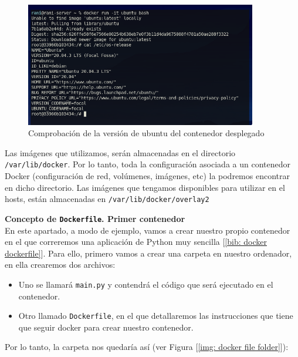 \documentclass[a4paper, oneside, 12pt]{book}
\begin{document}
	\begin{figure}[h]
		\begin{center}
			\includegraphics[width=0.9\textwidth]{img/docker_ubuntu_ver.png}
			\caption{Comprobación de la versión de ubuntu del contenedor desplegado}
			\label{img: docker ubuntu ver}
		\end{center}
	\end{figure}

	\noindent Las imágenes que utilizamos, serán almacenadas en el directorio \texttt{/var/lib/docker}. Por lo tanto, toda la configuración asociada a un contenedor Docker (configuración de red, volúmenes, imágenes, etc) la podremos encontrar en dicho directorio. Las imágenes que tengamos disponibles para utilizar en el hosts, están almacenadas en \texttt{/var/lib/docker/overlay2}

	\pagebreak

	\noindent \textbf{\large Concepto de \texttt{Dockerfile}. Primer contenedor}\\
	
	\noindent En este apartado, a modo de ejemplo, vamos a crear nuestro propio contenedor en el que correremos una aplicación de Python muy sencilla [\ref{bib: docker dockerfile}]. Para ello, primero vamos a crear una carpeta en nuestro ordenador, en ella crearemos dos archivos:
	\begin{itemize}
		\item Uno se llamará \texttt{main.py} y contendrá el código que será ejecutado en el contenedor.
		\item Otro llamado \texttt{Dockerfile}, en el que detallaremos las instrucciones que tiene que seguir docker para crear nuestro contenedor.
	\end{itemize}

	\noindent Por lo tanto, la carpeta nos quedaría así (ver Figura [\ref{img: docker file folder}]):
	
\end{document}
